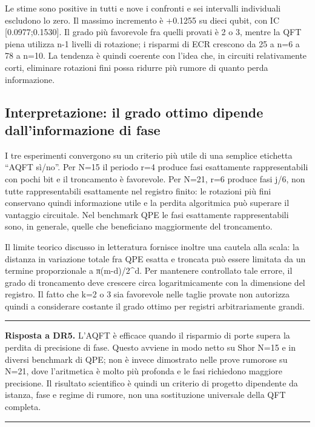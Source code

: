 Le stime sono positive in tutti e nove i confronti e sei intervalli individuali escludono lo zero. Il massimo incremento è +0.1255 su dieci qubit, con IC {[}0.0977;0.1530{]}. Il grado più favorevole fra quelli provati è 2 o 3, mentre la QFT piena utilizza n-1 livelli di rotazione; i risparmi di ECR crescono da 25 a n=6 a 78 a n=10. La tendenza è quindi coerente con l'idea che, in circuiti relativamente corti, eliminare rotazioni fini possa ridurre più rumore di quanto perda informazione.

\subsection{Interpretazione: il grado ottimo dipende dall'informazione di fase}\label{sec:finale_5_5_4}

I tre esperimenti convergono su un criterio più utile di una semplice etichetta ``AQFT sì/no''. Per N=15 il periodo r=4 produce fasi esattamente rappresentabili con pochi bit e il troncamento è favorevole. Per N=21, r=6 produce fasi j/6, non tutte rappresentabili esattamente nel registro finito: le rotazioni più fini conservano quindi informazione utile e la perdita algoritmica può superare il vantaggio circuitale. Nel benchmark QPE le fasi esattamente rappresentabili sono, in generale, quelle che beneficiano maggiormente del troncamento.

Il limite teorico discusso in letteratura \cite{barencoAQFT1996,akoramurthy2026} fornisce inoltre una cautela alla scala: la distanza in variazione totale fra QPE esatta e troncata può essere limitata da un termine proporzionale a π(m-d)/2\^{}d. Per mantenere controllato tale errore, il grado di troncamento deve crescere circa logaritmicamente con la dimensione del registro. Il fatto che k=2 o 3 sia favorevole nelle taglie provate non autorizza quindi a considerare costante il grado ottimo per registri arbitrariamente grandi.

\par\medskip\noindent\rule{\linewidth}{0.6pt}\par\nopagebreak
{\small{}\noindent \textbf{Risposta a DR5.} L'AQFT è efficace quando il risparmio di porte supera la perdita di precisione di fase. Questo avviene in modo netto su Shor N=15 e in diversi benchmark di QPE; non è invece dimostrato nelle prove rumorose su N=21, dove l'aritmetica è molto più profonda e le fasi richiedono maggiore precisione. Il risultato scientifico è quindi un criterio di progetto dipendente da istanza, fase e regime di rumore, non una sostituzione universale della QFT completa.\par}
\nopagebreak\noindent\rule{\linewidth}{0.6pt}\par\medskip

